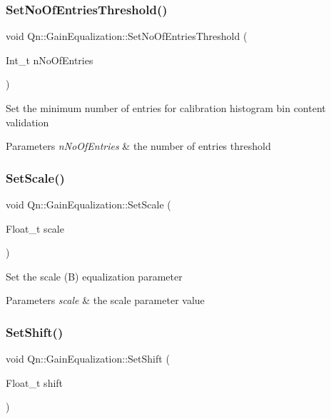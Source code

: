 \subsubsection{\texorpdfstring{Set\+No\+Of\+Entries\+Threshold()}{SetNoOfEntriesThreshold()}}
{\footnotesize\ttfamily void Qn\+::\+Gain\+Equalization\+::\+Set\+No\+Of\+Entries\+Threshold (\begin{DoxyParamCaption}\item[{Int\+\_\+t}]{n\+No\+Of\+Entries }\end{DoxyParamCaption})\hspace{0.3cm}{\ttfamily [inline]}}

Set the minimum number of entries for calibration histogram bin content validation 
\begin{DoxyParams}{Parameters}
{\em n\+No\+Of\+Entries} & the number of entries threshold \\
\hline
\end{DoxyParams}
\mbox{\label{classQn_1_1GainEqualization_a597dc9f7f5a6f7e1ec01eb907253f572}} 
\subsubsection{\texorpdfstring{Set\+Scale()}{SetScale()}}
{\footnotesize\ttfamily void Qn\+::\+Gain\+Equalization\+::\+Set\+Scale (\begin{DoxyParamCaption}\item[{Float\+\_\+t}]{scale }\end{DoxyParamCaption})\hspace{0.3cm}{\ttfamily [inline]}}

Set the scale (B) equalization parameter 
\begin{DoxyParams}{Parameters}
{\em scale} & the scale parameter value \\
\hline
\end{DoxyParams}
\mbox{\label{classQn_1_1GainEqualization_acb1f9095161f3beb43d9011bc7805303}} 
\subsubsection{\texorpdfstring{Set\+Shift()}{SetShift()}}
{\footnotesize\ttfamily void Qn\+::\+Gain\+Equalization\+::\+Set\+Shift (\begin{DoxyParamCaption}\item[{Float\+\_\+t}]{shift }\end{DoxyParamCaption})\hspace{0.3cm}{\ttfamily [inline]}}

